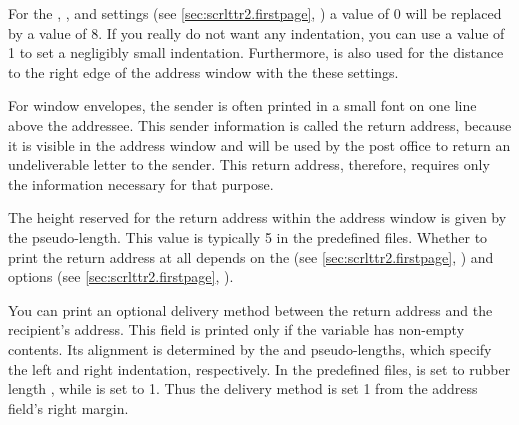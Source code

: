 For the
,
%
, and
%
 settings (see
\autoref{sec:scrlttr2.firstpage}, ) a
value of 0 will be replaced by a value of 8. If you really
do not want any indentation, you can use a value of 1 to set a
negligibly small indentation. Furthermore,  is also used
for the distance to the right edge of the address window with the these
 settings.%
\EndIndexGroup


\begin{Declaration}
\end{Declaration}
For window envelopes, the sender is often printed in a small font on one line
above the addressee. This sender information is called the return
address, because it is visible
in the address window and will be used by the post office to return an
undeliverable letter to the sender. This return address, therefore, requires
only the information necessary for that purpose.

The height reserved for the return address within the address window is given
by the  pseudo-length. This value is typically
5 in the predefined  files. Whether to print the return address
at all depends on the  (see
\autoref{sec:scrlttr2.firstpage}, ) and
 options (see
\autoref{sec:scrlttr2.firstpage}, ).%
\EndIndexGroup


\begin{Declaration}
\end{Declaration}
You can print an optional delivery method between the return address and the
recipient's address. This field is printed only if the
 variable has non-empty contents. Its
alignment is determined by the  and
 pseudo-lengths, which specify the left and
right indentation, respectively. In the predefined 
files,
 is set to rubber length , while
 is set to 1. Thus the delivery
method is set 1 from the address field's right margin.%
\EndIndexGroup


